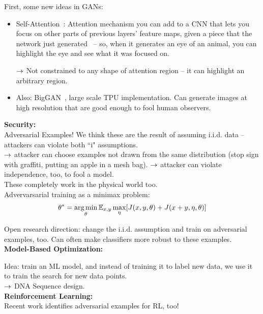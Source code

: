 First, some new ideas in GANs:
\begin{itemize}
    \item Self-Attention~\cite{wang2018non}: Attention mechanism you can add to a CNN that lets you focus on other parts of previous layers' feature maps, given a piece that the network just generated~\cite{} -- so, when it generates an eye of an animal, you can highlight the eye and see what it was focused on.
    
    $\rightarrow$ Not constrained to any shape of attention region -- it can highlight an arbitrary region.

    \item Also: BigGAN~\cite{brock2018large}, large scale TPU implementation. Can generate images at high resolution that are good enough to fool human observers.
\end{itemize}


{\bf Security:} \\

Adversarial Examples! We think these are the result of assuming i.i.d. data -- attackers can violate both ``i" assumptions. \\

$\rightarrow$ attacker can choose examples not drawn from the same distribution (stop sign with graffiti, putting an apple in a mesh bag).
$\rightarrow$ attacker can violate independence, too, to fool a model. \\

These completely work in the physical world too. \\

Advervarsarial training as a minimax problem:
\[
\theta^* = \operatorname*{arg\,min}_\theta \mathbb{E}_{x,y} \max_\eta[J(x,y,\theta) + J(x+y,\eta, \theta)]
\]

Open research direction: change the i.i.d. assumption and train on adversarial examples, too. Can often make classifiers more robust to these examples. \\

{\bf Model-Based Optimization:}

Idea: train an ML model, and instead of training it to label new data, we use it to train the search for new data points. \\

$\rightarrow$ DNA Sequence design. \\

{\bf Reinforcement Learning:} \\

Recent work identifies adversarial examples for RL, too! \\

